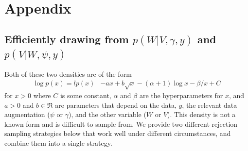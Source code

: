 \documentclass{article}
\begin{document}
\section{Appendix}\label{sec:append}

\subsection{Efficiently drawing from $p(W|V,\gamma,y)$ and $p(V|W,\psi,y)$}\label{sec:Append:scale}
Both of these two densities are of the form
\begin{align*}
\log p(x) = lp(x) & -ax + b\sqrt{x} - (\alpha + 1)\log x -\beta/x + C 
\end{align*}
for $x>0$ where $C$ is some constant, $\alpha$ and $\beta$ are the hyperparameters for $x$, and $a>0$ and $b\in \Re$ are parameters that depend on the data, $y$, the relevant data augmentation ($\psi$ or $\gamma$), and the other variable ($W$ or $V$). This density is not a known form and is difficult to sample from. We provide two different rejection sampling strategies below that work well under different circumstances, and combine them into a single strategy.
\end{document}

